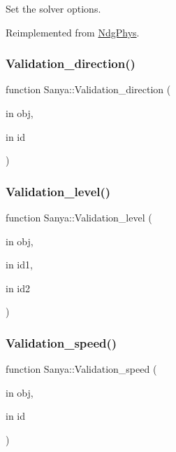 Set the solver options. 



Reimplemented from \hyperlink{class_ndg_phys_a5cd323275f4098db166471c4b078ed17}{Ndg\+Phys}.

\mbox{\label{class_sanya_ade239b8bd0dca435cdf63545a02f7e86}} 
\subsubsection{\texorpdfstring{Validation\+\_\+direction()}{Validation\_direction()}}
{\footnotesize\ttfamily function Sanya\+::\+Validation\+\_\+direction (\begin{DoxyParamCaption}\item[{in}]{obj,  }\item[{in}]{id }\end{DoxyParamCaption})\hspace{0.3cm}{\ttfamily [protected]}}

\mbox{\label{class_sanya_aa2a87328de59bfe468561bac287dd373}} 
\subsubsection{\texorpdfstring{Validation\+\_\+level()}{Validation\_level()}}
{\footnotesize\ttfamily function Sanya\+::\+Validation\+\_\+level (\begin{DoxyParamCaption}\item[{in}]{obj,  }\item[{in}]{id1,  }\item[{in}]{id2 }\end{DoxyParamCaption})\hspace{0.3cm}{\ttfamily [protected]}}

\mbox{\label{class_sanya_a876b9f8292887c87692a1b5b392e4e71}} 
\subsubsection{\texorpdfstring{Validation\+\_\+speed()}{Validation\_speed()}}
{\footnotesize\ttfamily function Sanya\+::\+Validation\+\_\+speed (\begin{DoxyParamCaption}\item[{in}]{obj,  }\item[{in}]{id }\end{DoxyParamCaption})\hspace{0.3cm}{\ttfamily [protected]}}




